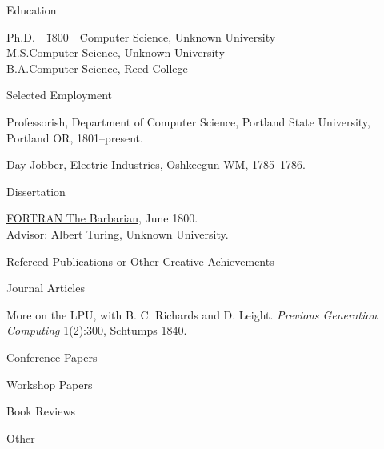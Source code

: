\documentclass{psu-vita}
\date{January 1890}
\author{Theodore Vitaee}
\newcommand{\vitacite}[1]{\item{}\incite{#1}}
\begin{document}
\maketitle

\begin{majorhead}{Education}
\item
\begin{tabbing}
Ph.D.~~\=1800~~\=Computer Science, Unknown University\\
M.S.\>Computer Science, Unknown University\\
B.A.\>Computer Science, Reed College
\end{tabbing}
\end{majorhead}
%
\begin{majorhead}{Selected Employment}
  \item 
    Professorish, Department of Computer Science, 
    Portland State University, Portland OR, 1801--present.
  \item
    Day Jobber, Electric Industries, Oshkeegun WM, 1785--1786.
\end{majorhead}
%
\begin{majorhead}{Dissertation}
  \item
    \underline{FORTRAN The Barbarian}, June 1800.
    \\
    Advisor: Albert Turing, Unknown University.
\end{majorhead}
\begin{majorhead}{Refereed Publications or Other Creative Achievements}
  \begin{minorhead}{Journal Articles}
    \vitacite{quantifying}
    \item
      More on the LPU, with
      B. C. Richards and D. Leight.
      {\em Previous Generation Computing\/}
      \mbox{1(2):300},
      Schtumps 1840.
  \end{minorhead}
%
  \begin{minorhead}{Conference Papers}
  \end{minorhead}
%
  \begin{minorhead}{Workshop Papers}
  \end{minorhead}
  \begin{minorhead}{Book Reviews}
  \end{minorhead}
  \begin{minorhead}{Other}
  \end{minorhead}
\end{majorhead}
\end{document}
